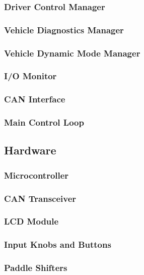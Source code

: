 \subsubsection{Driver Control Manager}


\subsubsection{Vehicle Diagnostics Manager}


\subsubsection{Vehicle Dynamic Mode Manager}


\subsubsection{I/O Monitor}


\subsubsection{CAN Interface}


\subsubsection{Main Control Loop}


\subsection{Hardware}


\subsubsection{Microcontroller}


\subsubsection{CAN Transceiver}


\subsubsection{LCD Module}


\subsubsection{Input Knobs and Buttons}


\subsubsection{Paddle Shifters}
